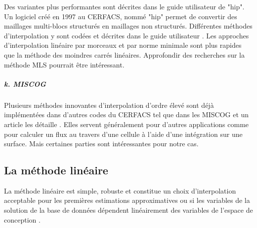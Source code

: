 Des variantes plus performantes sont décrites dans le guide utilisateur de "hip".
Un logiciel créé en 1997 au CERFACS, nommé "hip" permet de convertir des maillages multi-blocs structurés en maillages non structurés.
Différentes méthodes d'interpolation y sont codées et décrites dans le guide utilisateur \cite{muller2020}.
Les approches d'interpolation linéaire par morceaux et par norme minimale sont plus rapides que la méthode des moindres carrés linéaires. \cite{muller2020}
Approfondir des recherches sur la méthode \ac{MLS} \cite{MLS, levin} pourrait être intéressant.

\subparagraph{k. MISCOG}

\phantom{----}

Plusieurs méthodes innovantes d'interpolation d'ordre élevé sont déjà implémentées dans d'autres codes du CERFACS tel que dans les \ac{MISCOG} et un article les détaille \cite{laborderie2018}. Elles servent généralement pour d'autres applications comme pour calculer un flux au travers d'une cellule \cite{alexis} à l'aide d'une intégration sur une surface. Mais certaines parties sont intéressantes pour notre cas.




\newpage



\subsection{La méthode linéaire}
La méthode linéaire est simple, robuste et constitue un choix d'interpolation acceptable pour les premières estimations approximatives ou si les variables de la solution de la base de données dépendent linéairement des variables de l'espace de conception \cite{palmer2009}.


